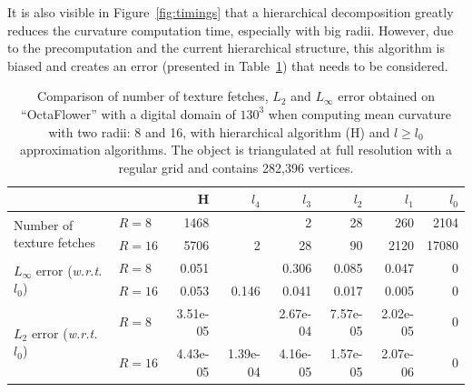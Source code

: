\documentclass{llncs}
\newcommand{\wrt}{\emph{w.r.t.}\xspace}
\begin{document}
It is also visible in Figure~\ref{fig:timings} that a hierarchical decomposition greatly reduces the curvature computation
time, especially with big radii.
However, due to the precomputation and the current hierarchical
structure, this algorithm is biased and creates an error (presented in
Table~\ref{tab:full-res-stat}) that needs to be considered.
%
%
\begin{table}
  \begin{center}
  \setlength{\tabcolsep}{0.15cm}
	\begin{tabular}{@{}llrrrrrr@{}}
      \toprule
        & & H & $l_4$ & $l_3$ & $l_2$ & $l_1$ & $l_0$\\
      \midrule
      \multirow{2}{2.2cm}{Number of texture fetches} & $R=8$ & 1468 & & 2 & 28 & 260 & 2104 \\
                                & $R=16$ & 5706 & 2 & 28 & 90 & 2120 & 17080\\\midrule

      \multirow{2}{2.2cm}{$L_\infty$ error (\wrt $l_0$)} & $R=8$ & 0.051 & & 0.306 & 0.085 & 0.047 & 0\\
                                    & $R=16$ & 0.053 & 0.146 & 0.041 & 0.017 & 0.005 & 0\\\midrule

      \multirow{2}{2.1cm}{$L_2$ error (\wrt $l_0$)} & $R=8$ & 3.51e-05 & & 2.67e-04 & 7.57e-05 & 2.02e-05 & 0\\
                               & $R=16$ & 4.43e-05 & 1.39e-04 & 4.16e-05 & 1.57e-05 & 2.07e-06 & 0\\
      \bottomrule
    \end{tabular}
  \end{center}
  \caption{Comparison of number of texture fetches, $L_2$ and $L_\infty$ error
  obtained on ``OctaFlower'' with a digital domain of $130^3$ when computing mean
  curvature with two radii: 8 and 16, with hierarchical algorithm (H) and $l \ge
  l_0$ approximation algorithms. The object is triangulated at full resolution
  with a regular grid and contains 282,396 vertices.\label{tab:full-res-stat}}
\end{table}
%
\end{document}

